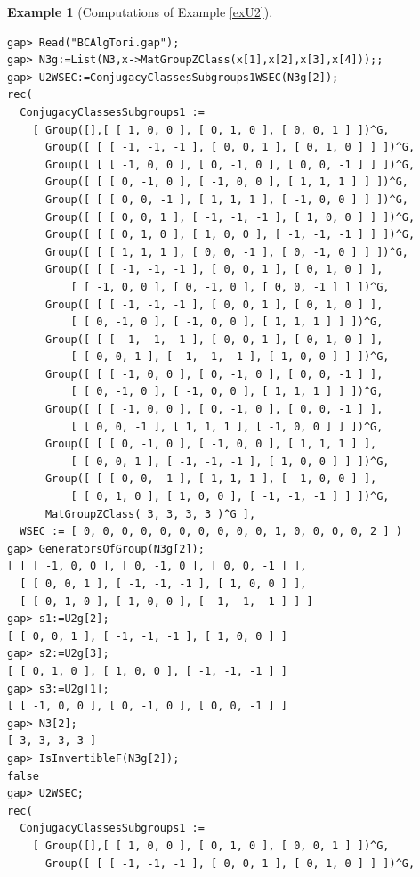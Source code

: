 \documentclass{amsart}
\theoremstyle{plain}
\theoremstyle{definition}
\newtheorem{example}[theorem]{Example}
\theoremstyle{remark}
\begin{document}
\bigskip
\begin{example}[{Computations of Example \ref{exU2}}]\label{ex9.10}~\vspace*{-5mm}\\
\begin{verbatim}
gap> Read("BCAlgTori.gap");
gap> N3g:=List(N3,x->MatGroupZClass(x[1],x[2],x[3],x[4]));;
gap> U2WSEC:=ConjugacyClassesSubgroups1WSEC(N3g[2]);
rec( 
  ConjugacyClassesSubgroups1 := 
    [ Group([],[ [ 1, 0, 0 ], [ 0, 1, 0 ], [ 0, 0, 1 ] ])^G, 
      Group([ [ [ -1, -1, -1 ], [ 0, 0, 1 ], [ 0, 1, 0 ] ] ])^G, 
      Group([ [ [ -1, 0, 0 ], [ 0, -1, 0 ], [ 0, 0, -1 ] ] ])^G, 
      Group([ [ [ 0, -1, 0 ], [ -1, 0, 0 ], [ 1, 1, 1 ] ] ])^G, 
      Group([ [ [ 0, 0, -1 ], [ 1, 1, 1 ], [ -1, 0, 0 ] ] ])^G, 
      Group([ [ [ 0, 0, 1 ], [ -1, -1, -1 ], [ 1, 0, 0 ] ] ])^G, 
      Group([ [ [ 0, 1, 0 ], [ 1, 0, 0 ], [ -1, -1, -1 ] ] ])^G, 
      Group([ [ [ 1, 1, 1 ], [ 0, 0, -1 ], [ 0, -1, 0 ] ] ])^G, 
      Group([ [ [ -1, -1, -1 ], [ 0, 0, 1 ], [ 0, 1, 0 ] ], 
          [ [ -1, 0, 0 ], [ 0, -1, 0 ], [ 0, 0, -1 ] ] ])^G, 
      Group([ [ [ -1, -1, -1 ], [ 0, 0, 1 ], [ 0, 1, 0 ] ], 
          [ [ 0, -1, 0 ], [ -1, 0, 0 ], [ 1, 1, 1 ] ] ])^G, 
      Group([ [ [ -1, -1, -1 ], [ 0, 0, 1 ], [ 0, 1, 0 ] ], 
          [ [ 0, 0, 1 ], [ -1, -1, -1 ], [ 1, 0, 0 ] ] ])^G, 
      Group([ [ [ -1, 0, 0 ], [ 0, -1, 0 ], [ 0, 0, -1 ] ], 
          [ [ 0, -1, 0 ], [ -1, 0, 0 ], [ 1, 1, 1 ] ] ])^G, 
      Group([ [ [ -1, 0, 0 ], [ 0, -1, 0 ], [ 0, 0, -1 ] ], 
          [ [ 0, 0, -1 ], [ 1, 1, 1 ], [ -1, 0, 0 ] ] ])^G, 
      Group([ [ [ 0, -1, 0 ], [ -1, 0, 0 ], [ 1, 1, 1 ] ], 
          [ [ 0, 0, 1 ], [ -1, -1, -1 ], [ 1, 0, 0 ] ] ])^G, 
      Group([ [ [ 0, 0, -1 ], [ 1, 1, 1 ], [ -1, 0, 0 ] ], 
          [ [ 0, 1, 0 ], [ 1, 0, 0 ], [ -1, -1, -1 ] ] ])^G, 
      MatGroupZClass( 3, 3, 3, 3 )^G ], 
  WSEC := [ 0, 0, 0, 0, 0, 0, 0, 0, 0, 0, 1, 0, 0, 0, 0, 2 ] )
gap> GeneratorsOfGroup(N3g[2]);
[ [ [ -1, 0, 0 ], [ 0, -1, 0 ], [ 0, 0, -1 ] ], 
  [ [ 0, 0, 1 ], [ -1, -1, -1 ], [ 1, 0, 0 ] ], 
  [ [ 0, 1, 0 ], [ 1, 0, 0 ], [ -1, -1, -1 ] ] ]
gap> s1:=U2g[2];
[ [ 0, 0, 1 ], [ -1, -1, -1 ], [ 1, 0, 0 ] ]
gap> s2:=U2g[3];
[ [ 0, 1, 0 ], [ 1, 0, 0 ], [ -1, -1, -1 ] ]
gap> s3:=U2g[1];
[ [ -1, 0, 0 ], [ 0, -1, 0 ], [ 0, 0, -1 ] ]
gap> N3[2];
[ 3, 3, 3, 3 ]
gap> IsInvertibleF(N3g[2]);
false
gap> U2WSEC;
rec( 
  ConjugacyClassesSubgroups1 := 
    [ Group([],[ [ 1, 0, 0 ], [ 0, 1, 0 ], [ 0, 0, 1 ] ])^G, 
      Group([ [ [ -1, -1, -1 ], [ 0, 0, 1 ], [ 0, 1, 0 ] ] ])^G, 

\end{verbatim}
\end{example}
\end{document}
